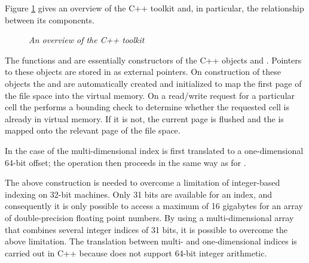 \documentclass[12pt,a4paper]{article}
\begin{document}
Figure \ref{cppt} gives an overview of the C++ toolkit and, in particular, the relationship between its components. 

\begin{figure}[h]
  \begin{center}
    \caption{\textsl{An overview of the C++ toolkit}}
    \label{cppt}
  \end{center}
\end{figure}


The \R{} functions  and  are essentially constructors of the C++ objects  and . 
Pointers to these objects are stored in \R{} as external pointers. 
On construction of these objects the  and  are automatically created and initialized to map the first page of the file space into the virtual memory. 
On a read/write request for a particular cell the  performs a bounding check to determine whether the requested cell is already in virtual memory. 
If it is not, the current page is flushed and the  is mapped onto the relevant page of the file space.

In the case of  the multi-dimensional index is first translated to a one-dimensional 64-bit offset; the operation then proceeds in the same way as for .

The above construction is needed to overcome a limitation of \R{} integer-based indexing on 32-bit machines. 
Only 31 bits are available for an index, and consequently it is only possible to access a maximum of 16 gigabytes for an array of double-precision floating point numbers.
By using a multi-dimensional array that combines several integer indices of 31 bits, it is possible to overcome the above limitation.
The translation between multi- and one-dimensional indices is carried out in C++ because \R{} does not support 64-bit integer arithmetic.

\end{document}
